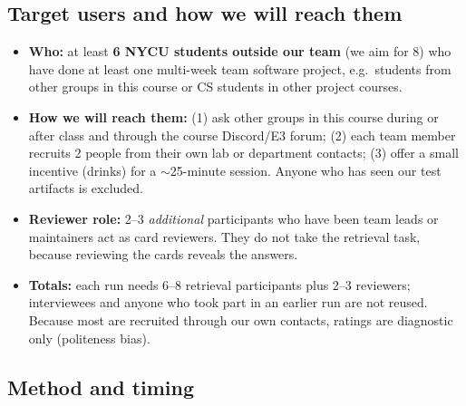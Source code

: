 \documentclass[11pt,a4paper]{article}
\begin{document}
\subsection{Target users and how we will reach them}
\begin{itemize}
  \item \textbf{Who:} at least \textbf{6 NYCU students outside our team} (we aim for 8) who have done at least one multi-week team software project, e.g.\ students from other groups in this course or CS students in other project courses.
  \item \textbf{How we will reach them:} (1) ask other groups in this course during or after class and through the course Discord/E3 forum; (2) each team member recruits 2 people from their own lab or department contacts; (3) offer a small incentive (drinks) for a $\sim$25-minute session. Anyone who has seen our test artifacts is excluded.
  \item \textbf{Reviewer role:} 2--3 \emph{additional} participants who have been team leads or maintainers act as card reviewers. They do not take the retrieval task, because reviewing the cards reveals the answers.
  \item \textbf{Totals:} each run needs 6--8 retrieval participants plus 2--3 reviewers; interviewees and anyone who took part in an earlier run are not reused. Because most are recruited through our own contacts, ratings are diagnostic only (politeness bias).
\end{itemize}

\subsection{Method and timing}\label{sec:method}
\end{document}
